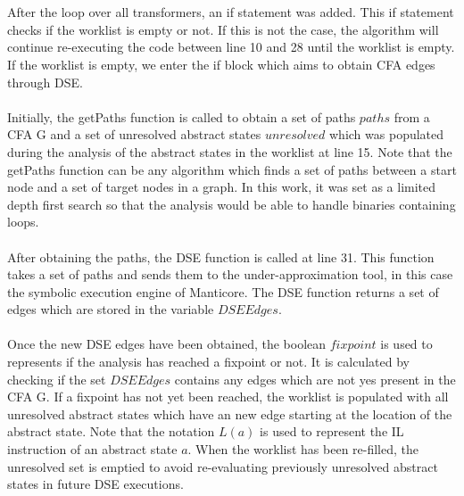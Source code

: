 \documentclass{kththesis}
\begin{document}
\\ \\
After the loop over all transformers, an if statement was added. This if statement checks if the worklist is empty or not. If this is not the case, the algorithm will continue re-executing the code between line 10 and 28 until the worklist is empty. If the worklist is empty, we enter the if block which aims to obtain CFA edges through DSE.
\\ \\
Initially, the getPaths function is called to obtain a set of paths $paths$ from a CFA G and a set of unresolved abstract states $unresolved$ which was populated during the analysis of the abstract states in the worklist at line 15. Note that the getPaths function can be any algorithm which finds a set of paths between a start node and a set of target nodes in a graph. In this work, it was set as a limited depth first search so that the analysis would be able to handle binaries containing loops.
\\ \\
After obtaining the paths, the DSE function is called at line 31. This function takes a set of paths and sends them to the under-approximation tool, in this case the symbolic execution engine of Manticore. The DSE function returns a set of edges which are stored in the variable $DSEEdges$. 
\\ \\
Once the new DSE edges have been obtained, the boolean $fixpoint$ is used to represents if the analysis has reached a fixpoint or not. It is calculated by checking if the set $DSEEdges$ contains any edges which are not yes present in the CFA G. If a fixpoint has not yet been reached, the worklist is populated with all unresolved abstract states which have an new edge starting at the location of the abstract state. Note that the notation $L(a)$ is used to represent the IL instruction of an abstract state $a$. When the worklist has been re-filled, the unresolved set is emptied to avoid re-evaluating previously unresolved abstract states in future DSE executions. 
\end{document}
